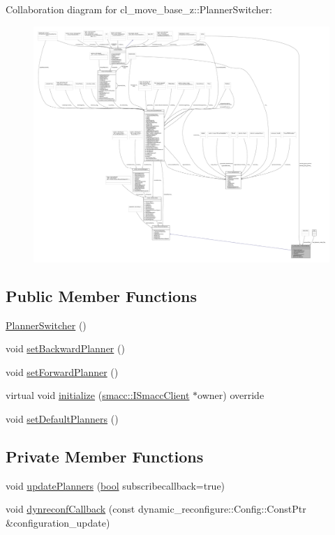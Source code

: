 Collaboration diagram for cl\+\_\+move\+\_\+base\+\_\+z\+:\+:Planner\+Switcher\+:
\nopagebreak
\begin{figure}[H]
\begin{center}
\leavevmode
\includegraphics[width=350pt]{classcl__move__base__z_1_1PlannerSwitcher__coll__graph}
\end{center}
\end{figure}
\subsection*{Public Member Functions}
\begin{DoxyCompactItemize}
\item 
\hyperlink{classcl__move__base__z_1_1PlannerSwitcher_aacdf8266ba7dc861efd460645587561f}{Planner\+Switcher} ()
\item 
void \hyperlink{classcl__move__base__z_1_1PlannerSwitcher_a6995deff44418a0965e4e793de8c4857}{set\+Backward\+Planner} ()
\item 
void \hyperlink{classcl__move__base__z_1_1PlannerSwitcher_a4bec9859c90f125f9fcc2b68594caf17}{set\+Forward\+Planner} ()
\item 
virtual void \hyperlink{classcl__move__base__z_1_1PlannerSwitcher_a8180bda19d3fdc2bcb3d9792002cd325}{initialize} (\hyperlink{classsmacc_1_1ISmaccClient}{smacc\+::\+I\+Smacc\+Client} $\ast$owner) override
\item 
void \hyperlink{classcl__move__base__z_1_1PlannerSwitcher_ad3f0d08a51af6218d203bf44a7f9df40}{set\+Default\+Planners} ()
\end{DoxyCompactItemize}
\subsection*{Private Member Functions}
\begin{DoxyCompactItemize}
\item 
void \hyperlink{classcl__move__base__z_1_1PlannerSwitcher_a146641f63aea3185daab4c5cbb789550}{update\+Planners} (\hyperlink{classbool}{bool} subscribecallback=true)
\item 
void \hyperlink{classcl__move__base__z_1_1PlannerSwitcher_ad9371bd8d62600ef874e8914c3ec177b}{dynreconf\+Callback} (const dynamic\+\_\+reconfigure\+::\+Config\+::\+Const\+Ptr \&configuration\+\_\+update)
\end{DoxyCompactItemize}
